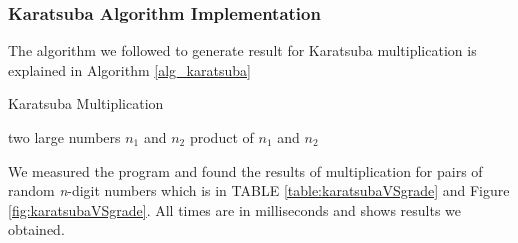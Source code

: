\documentclass[12pt,journal,compsoc]{IEEEtran}
\begin{document}

\subsubsection{\bf Karatsuba Algorithm Implementation}

The algorithm we followed to generate result for Karatsuba multiplication is explained in Algorithm \ref{alg_karatsuba}
\begin{algorithm}                      %
\caption{Karatsuba Multiplication}          %
\label{alg_karatsuba}                           %
\begin{algorithmic}                    %
    \REQUIRE two large numbers $n_1$ and $n_2$
    \ENSURE product of $n_1$ and $n_2$

    \ENDIF
    
    \ELSE
    \ENDIF
    
    
    
\end{algorithmic}
\end{algorithm}
%	

We measured the program and found the results of multiplication for pairs of random \emph{n}-digit numbers which is in TABLE \ref{table:karatsubaVSgrade} and Figure \ref{fig:karatsubaVSgrade}. All times are in milliseconds and  shows results we obtained.
\end{document}
